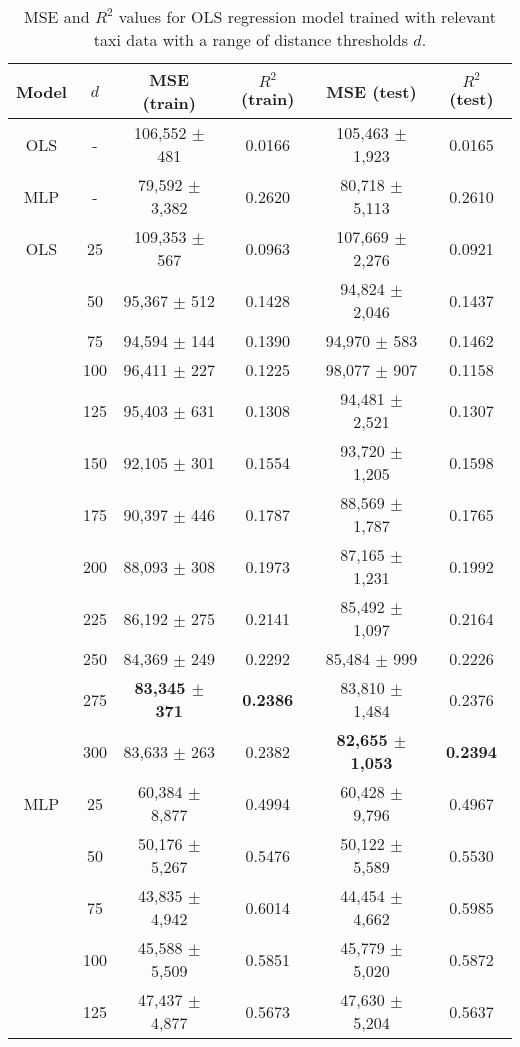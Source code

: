 \documentclass[useAMS, usenatbib]{biom}
\begin{document}
\begin{table}
\caption{MSE and $R^2$ values for OLS regression model trained with relevant taxi data with a range of distance thresholds $d$.}
\label{t:full_data_performance}
\begin{center}
\resizebox{\columnwidth}{!}
{
 \begin{tabular}{||c|c|c|c|c|c||}
 \hline
 Model & $d$ & MSE (train) & $R^2$ (train) & MSE (test) & $R^2$ (test) \\
 \hline
 OLS & - & 106,552 $\pm$ 481 & 0.0166 & 105,463 $\pm$ 1,923 & 0.0165 \\
 MLP & - & 79,592 $\pm$ 3,382 & 0.2620 & 80,718 $\pm$ 5,113 & 0.2610 \\
 \hline
 OLS & 25 & 109,353 $\pm$ 567 & 0.0963 & 107,669 $\pm$ 2,276 & 0.0921 \\
 & 50 & 95,367 $\pm$ 512 & 0.1428 & 94,824 $\pm$ 2,046 & 0.1437 \\
 & 75 & 94,594 $\pm$ 144 & 0.1390 & 94,970 $\pm$ 583 & 0.1462 \\
 & 100 & 96,411 $\pm$ 227 & 0.1225 & 98,077 $\pm$ 907 & 0.1158 \\
 & 125 & 95,403 $\pm$ 631 & 0.1308 & 94,481 $\pm$ 2,521 & 0.1307 \\
 & 150 & 92,105 $\pm$ 301 & 0.1554 & 93,720 $\pm$ 1,205 & 0.1598 \\
 & 175 & 90,397 $\pm$ 446 & 0.1787 & 88,569 $\pm$ 1,787 & 0.1765 \\
 & 200 & 88,093 $\pm$ 308 & 0.1973 & 87,165 $\pm$ 1,231 & 0.1992 \\
 & 225 & 86,192 $\pm$ 275 & 0.2141 & 85,492 $\pm$ 1,097 & 0.2164 \\
 & 250 & 84,369 $\pm$ 249 & 0.2292 & 85,484 $\pm$ 999 & 0.2226 \\
 & 275 & \textbf{83,345 $\pm$ 371} & \textbf{0.2386} & 83,810 $\pm$ 1,484 & 0.2376 \\
 & 300 & 83,633 $\pm$ 263 & 0.2382 & \textbf{82,655 $\pm$ 1,053} & \textbf{0.2394} \\
 \hline
 MLP & 25 & 60,384 $\pm$ 8,877 & 0.4994 & 60,428 $\pm$ 9,796 & 0.4967 \\
 & 50 & 50,176 $\pm$ 5,267 & 0.5476 & 50,122 $\pm$ 5,589 & 0.5530 \\
 & 75 & 43,835 $\pm$ 4,942 & 0.6014 & 44,454 $\pm$ 4,662 & 0.5985 \\
 & 100 & 45,588 $\pm$ 5,509 & 0.5851 & 45,779 $\pm$ 5,020 & 0.5872 \\
 & 125 & 47,437 $\pm$ 4,877 & 0.5673 & 47,630 $\pm$ 5,204 & 0.5637 \\

\end{tabular}}
\end{center}
\end{table}
\end{document}
